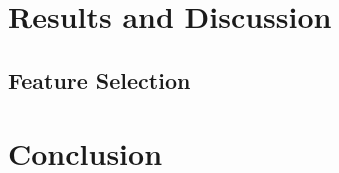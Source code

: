 \documentclass[12pt]{article}
\begin{document}
\section{Results and Discussion}

\subsection{Feature Selection}


\section{Conclusion}
\end{document}
